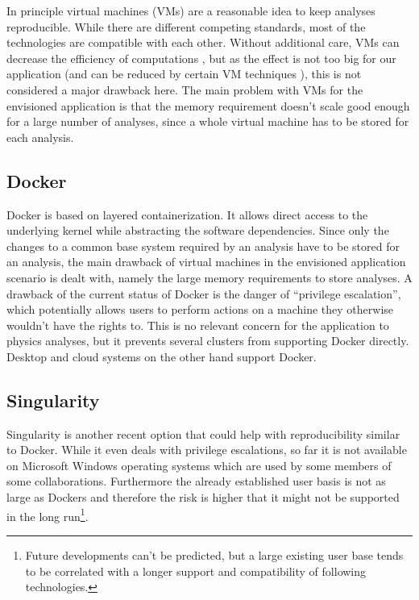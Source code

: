 \documentclass[a4paper, twoside, 11pt]{article}
\begin{document}
In principle virtual machines (VMs) are a reasonable idea to keep analyses reproducible. 
While there are different competing standards, most of the technologies are compatible with each other. 
Without additional care, VMs can decrease the efficiency of computations \cite{ieee:vmperformance}, but  
as the effect is not too big for our application 
(and can be reduced by certain VM techniques \cite{xen:about, ieee:vmperformance}), 
this is not considered a major drawback here. 
The main problem with VMs for the envisioned application is that the memory requirement doesn't 
scale good enough for a large number of analyses, 
since a whole virtual machine has to be stored for each analysis. 


\subsection{Docker}
Docker \cite{docker:about} is based on layered containerization. 
It allows direct access 
to the underlying kernel while abstracting the software dependencies. 
Since only the changes to a common base system required by an analysis have to be stored for an analysis, 
the main drawback of virtual machines in the envisioned application scenario is dealt with, 
namely the large memory requirements to store analyses. 
A drawback of the current status of Docker is the danger of ``privilege escalation'', 
which potentially allows users to perform actions on a machine they otherwise wouldn't have the rights to. 
This is no relevant concern for the application to physics analyses, 
but it prevents several clusters from supporting Docker directly. 
Desktop and cloud systems on the other hand support Docker. 


\subsection{Singularity}
Singularity \cite{singu:about} is another recent
option that could help with reproducibility similar to Docker. 
While it even deals with privilege escalations, 
so far it is not available on Microsoft Windows operating systems which are used by some members of some collaborations. 
Furthermore the already established user basis is not as large as Dockers 
and therefore the risk is higher that it might not be supported 
in the long run\footnote{Future developments can't be predicted, but a large existing user base tends to be 
correlated with a longer support and compatibility of following technologies.}. 
\end{document}
